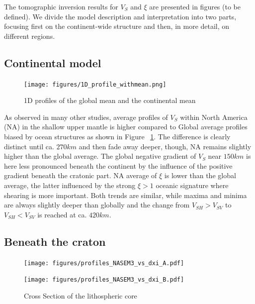 \documentclass[12pt]{article}
\begin{document}
The tomographic inversion results for $V_S$ and $\xi$ are presented in figures (to be defined). We divide the model description and interpretation into two parts, focusing first on the continent-wide structure and then, in more detail, on different regions.

\subsection{Continental model}
\begin{figure}[ht]
	\centering
	\texttt{[image: figures/1D\_profile\_withmean.png]}

	\caption{1D profiles of the global mean and the continental mean}
	\label{1daverage}
\end{figure}

As observed in many other studies, average profiles of $V_S$ within North America (NA) in the shallow upper mantle is higher compared to Global average profiles biased by ocean structures as shown in Figure ~\ref{1daverage}. 
The difference is clearly distinct until ca. $270km$ and then fade away deeper, though, NA remains slightly higher than the global average. 
The global negative gradient of $V_S$ near $150km$ is here less pronounced beneath the continent by the influence of the positive gradient beneath the cratonic part. 
NA average of $\xi$ is lower than the global average, the latter influenced by the strong $\xi > 1$ oceanic signature where shearing is more important. 
Both trends are similar, while maxima and minima are always slightly deeper than globally and the change from $V_{SH} > V_{SV}$ to $V_{SH} < V_{SV}$ is reached at ca. $420km$.

\subsection{Beneath the craton}

\begin{figure}[h]
	\begin{minipage}{0.5\linewidth}
		\centerline{\texttt{[image: figures/profiles\_NASEM3\_vs\_dxi\_A.pdf]}}
	\end{minipage}
	\hfill
	\begin{minipage}{0.5\linewidth}
		\centerline{\texttt{[image: figures/profiles\_NASEM3\_vs\_dxi\_B.pdf]}}
	\end{minipage}

	\caption{Cross Section of the lithospheric core}
	\label{cratoncross}

\end{figure}
\end{document}
